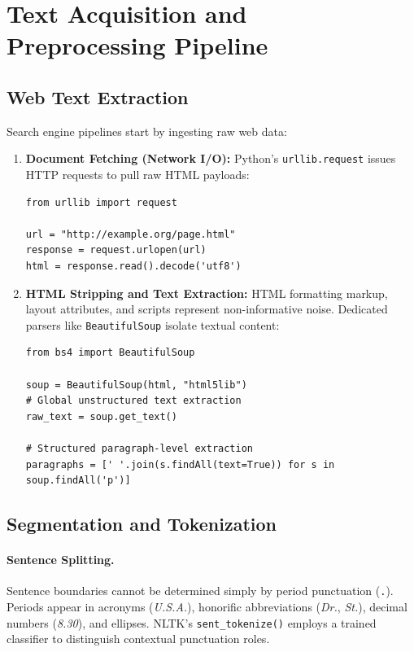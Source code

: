 \FloatBarrier
\section[Text Acquisition and Preprocessing Pipeline]{Text Acquisition and\\ Preprocessing Pipeline}
\label{sec:preprocessing-pipeline-en}

\subsection{Web Text Extraction}
Search engine pipelines start by ingesting raw web data:
\begin{enumerate}
    \item \textbf{Document Fetching (Network I/O):} Python's \texttt{urllib.request} issues HTTP requests to pull raw HTML payloads:
\begin{lstlisting}[style=pythoncode,caption={Downloading web markup using urllib.}]
from urllib import request

url = "http://example.org/page.html"
response = request.urlopen(url)
html = response.read().decode('utf8')
\end{lstlisting}

    \item \textbf{HTML Stripping and Text Extraction:} HTML formatting markup, layout attributes, and scripts represent non-informative noise. Dedicated parsers like \texttt{BeautifulSoup} isolate textual content:
\begin{lstlisting}[style=pythoncode,caption={Isolating clean textual content using BeautifulSoup.}]
from bs4 import BeautifulSoup

soup = BeautifulSoup(html, "html5lib")
# Global unstructured text extraction
raw_text = soup.get_text()

# Structured paragraph-level extraction
paragraphs = [' '.join(s.findAll(text=True)) for s in soup.findAll('p')]
\end{lstlisting}
\end{enumerate}

\subsection{Segmentation and Tokenization}
\label{sec:tokeniz-splitting-en}

\paragraph{Sentence Splitting.}
Sentence boundaries cannot be determined simply by period punctuation (\texttt{.}). Periods appear in acronyms (\textit{U.S.A.}), honorific abbreviations (\textit{Dr.}, \textit{St.}), decimal numbers (\textit{8.30}), and ellipses. NLTK's \texttt{sent\_tokenize()} employs a trained classifier to distinguish contextual punctuation roles.

